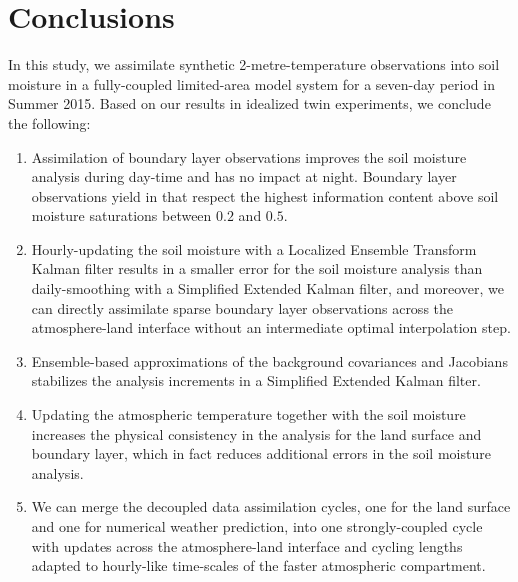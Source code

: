 \documentclass[hess, manuscript]{copernicus}
\begin{document}
\section{Conclusions}
In this study, we assimilate synthetic 2-metre-temperature observations into soil moisture in a fully-coupled limited-area model system for a seven-day period in Summer 2015.
Based on our results in idealized twin experiments, we conclude the following:
\begin{enumerate}
	\item Assimilation of boundary layer observations improves the soil moisture analysis during day-time and has no impact at night.
	Boundary layer observations yield in that respect the highest information content above soil moisture saturations between $0.2$ and $0.5$. 
	\item Hourly-updating the soil moisture with a Localized Ensemble Transform Kalman filter results in a smaller error for the soil moisture analysis than daily-smoothing with a Simplified Extended Kalman filter, and moreover, we can directly assimilate sparse boundary layer observations across the atmosphere-land interface without an intermediate optimal interpolation step.
	\item Ensemble-based approximations of the background covariances and Jacobians stabilizes the analysis increments in a Simplified Extended Kalman filter.
	\item Updating the atmospheric temperature together with the soil moisture increases the physical consistency in the analysis for the land surface and boundary layer, which in fact reduces additional errors in the soil moisture analysis.
	\item We can merge the decoupled data assimilation cycles, one for the land surface and one for numerical weather prediction, into one strongly-coupled cycle with updates across the atmosphere-land interface and cycling lengths adapted to hourly-like time-scales of the faster atmospheric compartment.
\end{enumerate}



%

\appendix






\end{document}

